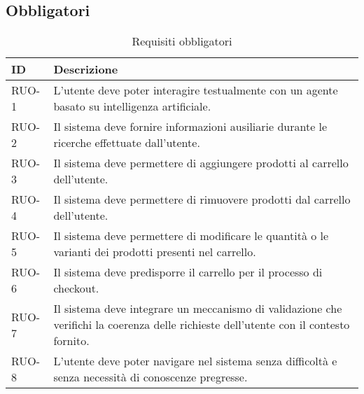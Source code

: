 \subsection{Obbligatori}

\begin{table}[H]
    \centering
    \caption{Requisiti obbligatori}
    \label{tab:requisiti-obbligatori}
    \begin{tabularx}{\textwidth}{|p{}|>{\raggedright\arraybackslash}X|}
        \hline
        \textbf{ID} & \textbf{Descrizione} \\
        \hline
        RUO-1\label{ru:RUO-1} & L'utente deve poter interagire testualmente con un agente basato su intelligenza artificiale. \\
        \hline
        RUO-2\label{ru:RUO-2} & Il sistema deve fornire informazioni ausiliarie durante le ricerche effettuate dall'utente. \\
        \hline
        RUO-3\label{ru:RUO-3} & Il sistema deve permettere di aggiungere prodotti al carrello dell'utente. \\
        \hline
        RUO-4\label{ru:RUO-4} & Il sistema deve permettere di rimuovere prodotti dal carrello dell'utente. \\
        \hline
        RUO-5\label{ru:RUO-5} & Il sistema deve permettere di modificare le quantità o le varianti dei prodotti presenti nel carrello. \\
        \hline
        RUO-6\label{ru:RUO-6} & Il sistema deve predisporre il carrello per il processo di checkout. \\
        \hline
        RUO-7\label{ru:RUO-7} & Il sistema deve integrare un meccanismo di validazione che verifichi la coerenza delle richieste dell'utente con il contesto fornito. \\
        \hline
        RUO-8\label{ru:RUO-8} & L'utente deve poter navigare nel sistema senza difficoltà e senza necessità di conoscenze pregresse. \\
        \hline
    \end{tabularx}
\end{table}


